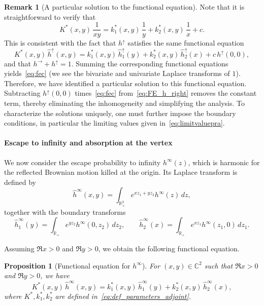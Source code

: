 \documentclass[11pt]{article}
\newtheorem{prop}[thm]{Proposition}
\theoremstyle{definition}
\newtheorem{rem}[thm]{Remark}
\begin{document}
\begin{rem}[A particular solution to the functional equation]
\label{rem:partsol}
Note that it is straightforward to verify that
\begin{equation}
\label{eq:fec}
K^*(x,y)\,\frac{1}{xy}
=
k_1^*(x,y)\,\frac{1}{y}
+
k_2^*(x,y)\,\frac{1}{x}
+
c.
\end{equation}
This is consistent with the fact that $h^\uparrow$ satisfies the same functional equation
\[
K^*(x,y)\,\widehat h^\uparrow(x,y)
=
k_1^*(x,y)\,\widehat h^\uparrow_1(y)
+
k_2^*(x,y)\,\widehat h^\uparrow_2(x)
+
c\,h^\uparrow(0,0),
\]
and that $h^\rightarrow + h^\uparrow = 1$. Summing the corresponding functional equations yields~\eqref{eq:fec} (we see the bivariate and univariate Laplace transforms of $1$).
Therefore, we have identified a particular solution to this functional equation. Subtracting $h^\uparrow(0,0)$ times~\eqref{eq:fec} from~\eqref{eq:FE_h_right} removes the constant term, thereby eliminating the inhomogeneity and simplifying the analysis. 
To characterize the solutions uniquely, one must further impose the boundary conditions, in particular the limiting values given in~\eqref{eq:limitvaluepra}.
\end{rem}

\paragraph{Escape to infinity and absorption at the vertex}

We now consider the escape probability to infinity $h^\infty(z)$, which is harmonic for the reflected Brownian motion killed at the origin. Its Laplace transform is defined by
\begin{equation}
\label{eq:Lap_h_inf}
\widehat h^\infty(x,y)
=
\int_{\mathbb R_+^2} e^{x z_1 + y z_2} h^\infty(z)\,dz,
\end{equation}
together with the boundary transforms
\begin{equation}
\label{eq:Lap_h_inf1}
\widehat h^\infty_1(y)
=
\int_{\mathbb R_+} e^{y z_2} h^\infty(0,z_2)\,dz_2,
\qquad
\widehat h^\infty_2(x)
=
\int_{\mathbb R_+} e^{x z_1} h^\infty(z_1,0)\,dz_1.
\end{equation}

Assuming $\Re x>0$ and $\Re y>0$, we obtain the following functional equation.

\begin{prop}[Functional equation for $h^\infty$]
For $(x,y)\in\mathbb C^2$ such that $\Re x>0$ and $\Re y>0$, we have
\begin{equation}
\label{eq:FE_h_inf}
K^*(x,y)\,\widehat h^\infty(x,y)
=
k_1^*(x,y)\,\widehat h^\infty_1(y)
+
k_2^*(x,y)\,\widehat h^\infty_2(x),
\end{equation}
where $K^*,k_1^*,k_2^*$ are defined in~\eqref{eq:def_parameters_adjoint}.
\end{prop}
\end{document}
